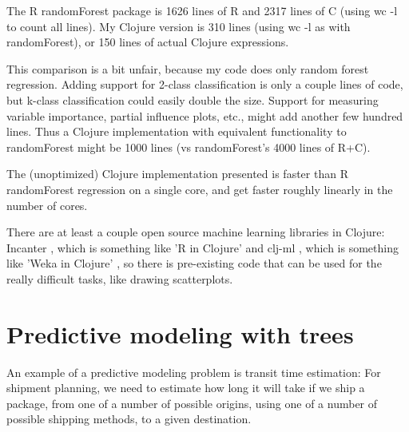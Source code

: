 \documentclass[10pt,openany]{article}
\numberwithin{definition}{section}
\numberwithin{example}{section}
\numberwithin{equation}{section}
\numberwithin{figure}{section}
\begin{document}
The R randomForest package is 1626 lines of R and 2317 lines of C
(using wc -l to count all lines). My Clojure version is 310 lines
(using wc -l as with randomForest), or 150 lines of actual Clojure
expressions. 

This comparison is a bit unfair, because my code does only random
forest regression. Adding support for 2-class classification is only
a couple lines of code, but k-class classification could easily double
the size. Support for measuring variable importance, partial influence
plots, etc., might add another few hundred lines. Thus a Clojure implementation
with equivalent functionality to randomForest might be 1000 lines
(vs randomForest's 4000 lines of R+C).

The (unoptimized) Clojure implementation presented is faster than
R randomForest regression on a single core, and get faster roughly
linearly in the number of cores.

There are at least a couple open source machine learning libraries
in Clojure: Incanter \cite{incanter-2011}, which is something like
'R in Clojure' and clj-ml \cite{clj-ml-2012}, which is something
like 'Weka in Clojure' \cite{weka-3}, so there is pre-existing code
that can be used for the really difficult tasks, like drawing scatterplots.

\newpage{}


\section{\label{sec:Predictive-modeling-with}Predictive modeling with trees}

An example of a predictive modeling problem is transit time estimation:
For shipment planning, we need to estimate how long it will take if
we ship a package, from one of a number of possible origins, using
one of a number of possible shipping methods, to a given destination. 
\end{document}
